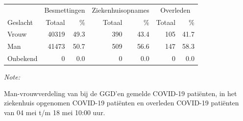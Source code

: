 \documentclass[
  english,
  man,floatsintext]{apa6}
\begin{document}
\begin{table}
\centering\begingroup\fontsize{11}{13}\selectfont

\begin{threeparttable}
\begin{tabular}{lrrrrrr}
\toprule
\multicolumn{1}{c}{ } & \multicolumn{2}{c}{Besmettingen} & \multicolumn{2}{c}{Ziekenhuisopnames} & \multicolumn{2}{c}{Overleden} \\
\cmidrule(l{3pt}r{3pt}){2-3} \cmidrule(l{3pt}r{3pt}){4-5} \cmidrule(l{3pt}r{3pt}){6-7}
Geslacht & Totaal & \% & Totaal & \% & Totaal & \%\\
\midrule
Vrouw & 40319 & 49.3 & 390 & 43.4 & 105 & 41.7\\
Man & 41473 & 50.7 & 509 & 56.6 & 147 & 58.3\\
Onbekend & 0 & 0.0 & 0 & 0.0 & 0 & 0.0\\
\bottomrule
\end{tabular}
\begin{tablenotes}
\item \textit{Note: } 
\item Man-vrouwverdeling van bij de GGD’en gemelde COVID-19 patiënten, in het ziekenhuis opgenomen COVID-19 patiënten en overleden COVID-19 patiënten van 04 mei t/m 18 mei 10:00 uur.
\end{tablenotes}
\end{threeparttable}
\endgroup{}
\end{table}
\newpage
\end{document}
